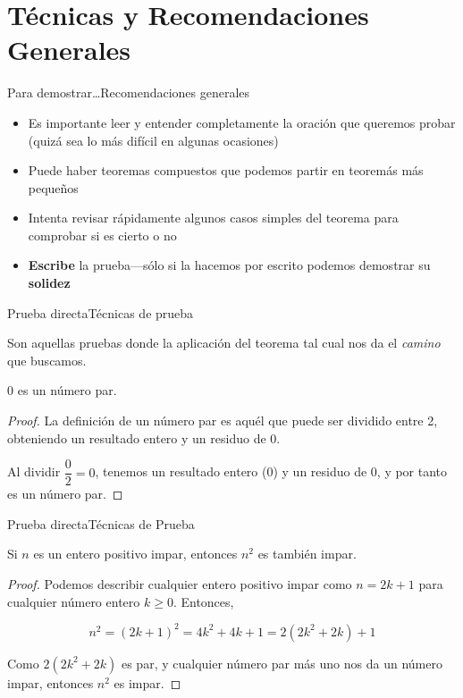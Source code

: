 \documentclass[spanish, c]{beamer}
\begin{document}
\section{Técnicas y Recomendaciones Generales}

\begin{frame}{Para demostrar\dots}{Recomendaciones generales}

    \begin{itemize}[<+->]
        \item Es importante leer y entender completamente la oración que queremos probar (quizá sea lo más difícil en algunas ocasiones)
        \item Puede haber teoremas compuestos que podemos partir en teoremás más pequeños
        \item Intenta revisar rápidamente algunos casos simples del teorema para comprobar si es cierto o no
        \item \textbf{Escribe} la prueba---sólo si la hacemos por escrito podemos demostrar su \textbf{solidez}
    \end{itemize}

\end{frame}

\begin{frame}{Prueba directa}{Técnicas de prueba}

    Son aquellas pruebas donde la aplicación del teorema tal cual nos da el \textit{camino} que buscamos. \pause

    \begin{theorem}
        0 es un número par.
    \end{theorem}

    \begin{proof}
        La definición de un número par es aquél que puede ser dividido entre 2, obteniendo un resultado entero y un residuo de 0.

        Al dividir $\dfrac{0}{2} = 0$, tenemos un resultado entero (0) y un residuo de 0, y por tanto es un número par.
    \end{proof}

\end{frame}

\begin{frame}{Prueba directa}{Técnicas de Prueba}
    
    \begin{theorem}
        \label{th:02}
        Si $n$ es un entero positivo impar, entonces $n^2$ es también impar.
    \end{theorem}

    \begin{proof}
        Podemos describir cualquier entero positivo impar como $n = 2k + 1$ para cualquier número entero $k \geq 0$. Entonces,

        $$n^2 = (2k +1)^2 = 4k^2 +4k + 1 = 2(2k^2 + 2k) + 1$$

        Como $2(2k^2 + 2k)$ es par, y cualquier número par más uno nos da un número impar, entonces $n^2$ es impar.
    \end{proof}

\end{frame}
\end{document}
